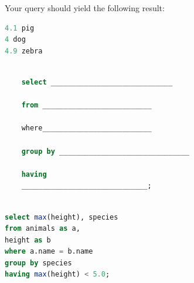 \documentclass{exam}
\begin{document}
\begin{questions}
Your query should yield the following result:
\begin{lstlisting}[language=SQL]
4.1 pig
4 dog
4.9 zebra
\end{lstlisting}

\begin{lstlisting}[language=SQL]

    select _____________________________ 

    from __________________________

    where__________________________

    group by _______________________________

    having 
    ______________________________;
\end{lstlisting}

\begin{solution}
\begin{lstlisting}[language=SQL]
 
select max(height), species
from animals as a, 
height as b
where a.name = b.name
group by species
having max(height) < 5.0;
\end{lstlisting}
\end{solution}

\end{questions}

\end{document}
